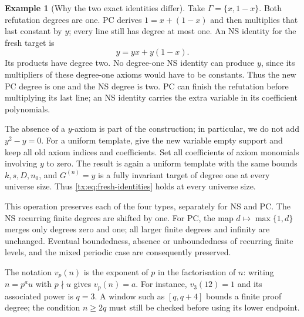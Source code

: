 \documentclass[11pt,a4paper,oneside,openany]{book}
\theoremstyle{definition}\newtheorem{definition}[theorem]{Definition}
\newtheorem{example}[theorem]{Example}
\theoremstyle{remark}\newtheorem{remark}[theorem]{Remark}
\numberwithin{equation}{chapter}
\begin{document}
\begin{example}[Why the two exact identities differ]
Take $\Gamma=\{x,1-x\}$. Both refutation degrees are one. PC derives
$1=x+(1-x)$ and then multiplies that last constant by $y$; every line
still has degree at most one. An NS identity for the fresh target is
\[
                             y=yx+y(1-x).
\]
Its products have degree two. No degree-one NS identity can produce
$y$, since its multipliers of these degree-one axioms would have to
be constants. Thus the new PC degree is one and the NS degree is two.
PC can finish the refutation before multiplying its last line; an NS
identity carries the extra variable in its coefficient polynomials.
\end{example}

The absence of a $y$-axiom is part of the construction; in particular,
we do not add $y^2-y=0$. For a uniform template, give the new variable
empty support and keep all old axiom indices and coefficients. Set
all coefficients of axiom monomials involving $y$ to zero. The result
is again a uniform template with the same bounds $k,s,D,n_0$, and
$G^{(n)}=y$ is a fully invariant target of degree one at every universe size.
Thus \eqref{tx:eq:fresh-identities} holds at every universe size.

This operation preserves each of the four types, separately for NS
and PC. The NS recurring finite degrees are shifted by one. For PC,
the map $d\mapsto\max\{1,d\}$ merges only degrees zero and one;
all larger finite degrees and infinity are unchanged. Eventual
boundedness, absence or unboundedness of recurring finite levels, and
the mixed periodic case are consequently preserved.

The notation $v_p(n)$ is the exponent of $p$ in the factorisation of
$n$: writing $n=p^a u$ with $p\nmid u$ gives $v_p(n)=a$.
For instance, $v_3(12)=1$ and its associated power is $q=3$.
A window such as $[q,q+4]$ bounds a finite proof degree; the condition
$n\ge2q$ must still be checked before using its lower endpoint.
\end{document}
